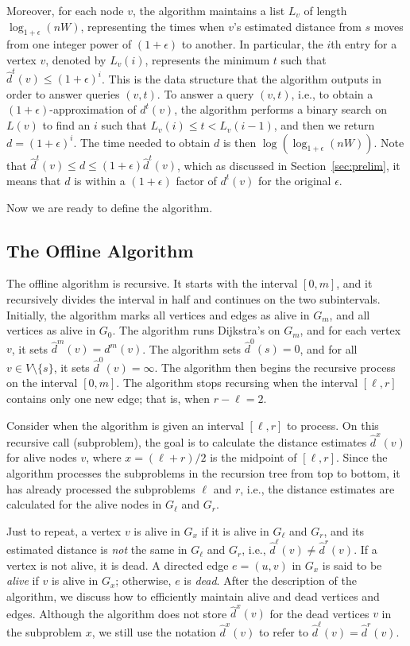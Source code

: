 \documentclass[11pt]{article}
\begin{document}
Moreover, for each node $v$, the algorithm maintains a list $L_v$ of length
$\log_{1 + \epsilon}( nW)$, representing the times when $v$'s estimated distance from $s$ moves from one integer power of $(1+\epsilon)$ to another.
In particular, the $i$th entry for a vertex $v$, denoted by $L_v(i)$, represents the minimum $t$ such that $\hat{d}^t(v) \leq (1 + \epsilon)^i$.
This is the data structure that the algorithm outputs in order to answer queries $(v,t)$.
To answer a query $(v,t)$, i.e., to obtain a $(1+\epsilon)$-approximation of $d^t(v)$, the algorithm performs  a binary search on $L(v)$ to find an $i$ such that $L_v(i) \leq t < L_v(i-1)$, and then we return $d=(1+\epsilon)^i$.
The time needed to obtain $d$ is then $\log (\log_{1+\epsilon}(nW))$. 
Note that $\hat{d}^t(v) \leq d \leq (1+\epsilon)\hat{d}^t(v)$, which as discussed in Section~\ref{sec:prelim}, it means that $d$ is within a $(1+\epsilon)$ factor of $d^t(v)$ for the original $\epsilon$.

Now we are ready to define the algorithm.

\subsection{The Offline Algorithm}
\label{sec:offline_algorithm}

The offline algorithm is recursive.
It starts with the interval $[0,m]$, and it recursively divides the interval in half and continues on the two subintervals.
Initially, the algorithm marks all vertices and edges as alive in $G_m$, and all vertices as alive in $G_0$. The algorithm runs  Dijkstra's  on $G_m$, and for each vertex $v$, it sets $\hat{d}^m(v) = d^m(v)$. The algorithm sets $\hat{d}^0(s) = 0$, and for all $v \in V \setminus \{s\}$, it sets $\hat{d}^0(v) = \infty$.  The algorithm then begins the recursive process on the interval $[0, m]$.
The algorithm stops recursing when the interval $[\ell,r]$ contains only one new edge; that is, when $r-\ell=2$.

Consider when the algorithm is given an interval $[\ell, r]$ to process. 
On this recursive call (subproblem), the goal is to calculate the distance estimates $\hat{d}^x(v)$ for alive nodes $v$, where $x = (\ell + r)/2$ is the midpoint of $[\ell,r]$.
Since the algorithm processes the subproblems in the recursion tree from top to bottom, it has already processed the subproblems $\ell$ and $r$, i.e., the distance estimates are calculated for the alive nodes in $G_\ell$ and $G_r$.

Just to repeat, a vertex $v$ is alive in $G_x$ if it is alive in $G_\ell$ and $G_r$, and its estimated distance is \emph{not} the same in $G_\ell$ and $G_r$, i.e., $\hat{d}^\ell(v) \neq \hat{d}^r(v)$. If a vertex is not alive, it is dead.   
A directed edge $e = (u,v)$ in $G_x$ is said to be \emph{alive} if $v$ is alive in $G_x$; otherwise, $e$ is \emph{dead}. After the description of the algorithm, we discuss how to efficiently maintain alive and dead vertices and edges. 
Although the algorithm does not store $\hat{d}^x(v)$ for the dead vertices $v$ in the subproblem $x$, we still use the notation $\hat{d}^x(v)$ to refer to $\hat{d}^\ell(v) = \hat{d}^r(v)$.
\end{document}
